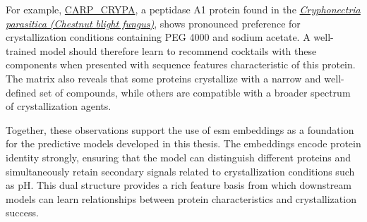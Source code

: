 For example, \href{https://www.uniprot.org/uniprotkb/P11838/entry}{CARP\_CRYPA}, a peptidase A1 protein found in the  \textit{\href{https://www.uniprot.org/taxonomy/5116}{Cryphonectria parasitica (Chestnut blight fungus)}}, shows pronounced preference for crystallization conditions containing PEG 4000 and sodium acetate. A well-trained model should therefore learn to recommend cocktails with these components when presented with sequence features characteristic of this protein. The matrix also reveals that some proteins crystallize with a narrow and well-defined set of compounds, while others are compatible with a broader spectrum of crystallization agents.

Together, these observations support the use of \gls{esm} embeddings as a foundation for the predictive models developed in this thesis. The embeddings encode protein identity strongly, ensuring that the model can distinguish different proteins and simultaneously retain secondary signals related to crystallization conditions such as pH. This dual structure provides a rich feature basis from which downstream models can learn relationships between protein characteristics and crystallization success.

